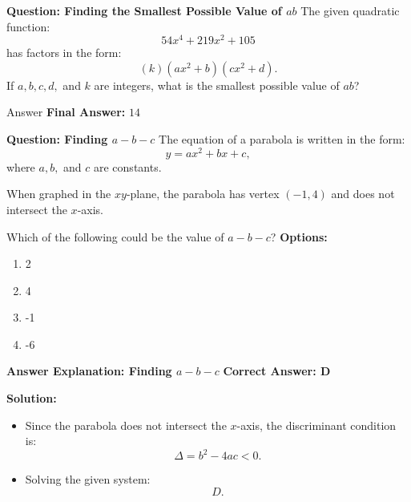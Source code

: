 \documentclass{beamer}
\begin{document}
\begin{frame}{\textbf{Question: Finding the Smallest Possible Value of \( ab \)}}
    The given quadratic function:
    \[
    54x^4 + 219x^2 + 105
    \]
    has factors in the form:
    \[
    (k)(ax^2 + b)(cx^2 + d).
    \]
    If \( a, b, c, d, \) and \( k \) are integers, what is the smallest possible value of \( ab \)?
\end{frame}

\begin{frame}{Answer}
    \textbf{Final Answer:} $\boxed{14}$
\end{frame}


\begin{frame}{\textbf{Question: Finding \( a - b - c \)}}
    The equation of a parabola is written in the form:
    \[
    y = ax^2 + bx + c,
    \]
    where \( a, b, \) and \( c \) are constants.  

    \vspace{0.3cm}
    When graphed in the \( xy \)-plane, the parabola has vertex \( (-1, 4) \) and does not intersect the \( x \)-axis.  

    \vspace{0.3cm}
    Which of the following could be the value of \( a - b - c \)?
    \textbf{Options:}
    \begin{enumerate}
        \item[A] 2
        \item[B] 4
        \item[C] -1
        \item[D] -6
    \end{enumerate}


    
\end{frame}




\begin{frame}{\textbf{Answer Explanation: Finding \( a - b - c \)}}
    \textbf{Correct Answer: \textcolor{novelPurple}{\( \mathbf{D} \)}}  

    \vspace{0.3cm}
    \textbf{Solution:}
    \begin{itemize}
        \item Since the parabola does not intersect the \( x \)-axis, the discriminant condition is:
        \[
        \Delta = b^2 - 4ac < 0.
        \]
        \item Solving the given system:
        \[
        \boxed{D}.
        \]
    \end{itemize}
\end{frame}
\end{document}
